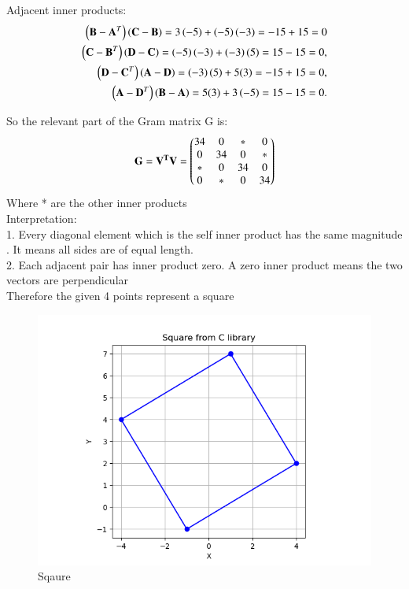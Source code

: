 \documentclass[journal]{IEEEtran}
\theoremstyle{remark}
\begin{document}
Adjacent inner products:
\begin{align}
\left(\mathbf{B-A}^T\right)\left(\mathbf{C-B}\right) = 3\left(-5\right) + \left(-5\right)\left(-3\right) = -15 + 15 = 0\\
\left(\mathbf{C-B}^T\right) \left(\mathbf{D-C}\right) = \left(-5\right)\left(-3\right) + \left(-3\right)(5) = 15 - 15 = 0,\\
\left(\mathbf{D-C}^T\right) \left(\mathbf{A-D}\right) = \left(-3\right)(5) + 5(3) = -15 + 15 = 0,\\
\left(\mathbf{A-D}^T\right) \left(\mathbf{B-A}\right) = 5(3) + 3\left(-5\right) = 15 - 15 = 0.
\end{align}

So the relevant part of the Gram matrix G 
 is:
\begin{align}
\mathbf{G}=\mathbf{V^TV}=\begin{pmatrix}34&0&*&0\\0&34&0&*\\ *&0&34&0\\0&*&0&34\end{pmatrix}
\end{align}
Where * are the other inner products \\
Interpretation:\\
1. Every diagonal element which is the self inner product has the same magnitude . It means all sides are of equal length.\\
2. Each adjacent pair has inner product zero. A zero inner product means the two vectors are perpendicular\\
Therefore the given 4 points represent a square



\begin{figure}[H]
    \centering
    \includegraphics[width=1\columnwidth]{figs/square.png}
    \caption{Sqaure}
    \label{fig:placeholder_1}
\end{figure}
\end{document}
